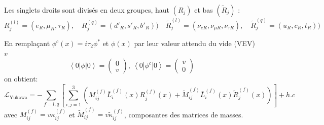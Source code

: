 Les singlets droits sont divisés en deux groupes, haut $\left(R_{j}\right)$ et bas $\left(\tilde{R}_{j}\right)$ :
\begin{equation}
R_j^{(l)}=\left(e_{R},\mu_{R},\tau_{R}\right),\quad R_j^{(q)}=\left(d'_{R},s'_{R},b'_{R}\right)) \quad \tilde{R}_j^{(l)}=\left(\nu_{eR},\nu_{\mu R},\nu_{\tau R}\right),\quad \tilde{R}_j^{(q)}=\left(u_{R},c_{R},t_{R}\right))
\end{equation} 

En remplaçant $\phi^{c}(x)=i\tau_{2}\phi^{*}$ et $\phi(x)$ par leur valeur attendu du vide (VEV) $v$
\begin{equation}
\left<0\left|\phi \right|0\right>=\begin{pmatrix} 0\\v\end{pmatrix},\ \left<0\left|\phi^{c} \right|0\right>=\begin{pmatrix} v\\ 0\end{pmatrix}
\end{equation} on obtient:
\begin{equation}
\mathcal{L}_{\mathrm{Yukawa}}=-\sum_{f=l,q}\left[\sum_{i,j=1}^{3}\left(M^{(f)}_{ij}\bar{L}_{i}^{(f)}(x)R_{j}^{(f)}(x)+\tilde{M}^{(f)}_{ij}\bar{L}_{i}^{(f)}(x)\tilde{R}_{j}^{(f)}(x)\right)\right]+ h.c
\end{equation} 
avec $M^{(f)}_{ij}=v\kappa_{ij}^{(f)}$ et $\tilde{M}^{(f)}_{ij}=v\tilde{\kappa}_{ij}^{(f)}$, composantes des matrices de masses.

